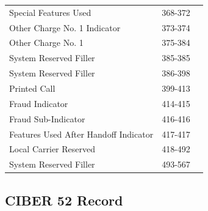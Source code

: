 \documentclass[12pt,twoside]{article}
\begin{document}
\begin{longtable}{lrr}
 Special Features Used                     &            368-372  &                        \\
 Other Charge No. 1 Indicator              &            373-374  &                        \\
 Other Charge No. 1                        &            375-384  &                        \\
 System Reserved Filler                    &            385-385  &                        \\
 System Reserved Filler                    &            386-398  &                        \\
 Printed Call                              &            399-413  &                        \\
 Fraud Indicator                           &            414-415  &                        \\
 Fraud Sub-Indicator                       &            416-416  &                        \\
 Features Used After Handoff Indicator     &            417-417  &                        \\
 Local Carrier Reserved                    &            418-492  &                        \\
 System Reserved Filler                    &            493-567  &                        \\
\hline
\end{longtable}

\normalsize
\subsection{CIBER 52 Record}
\label{sec-6-5}
\end{document}
